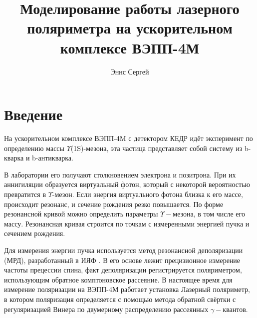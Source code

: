 \documentclass[14pt, a4paper]{extreport}
\begin{document}
\title{Моделирование работы лазерного поляриметра на ускорительном комплексе ВЭПП-4М}
\author{Эннс Сергей}
\maketitle

\tableofcontents
\newpage
\chapter*{ Введение}
На ускорительном комплексе ВЭПП-4M \cite{vepp4} с детектором КЕДР
\cite{kedr} идёт эксперимент по определению массы $\Upsilon$(1S)-мезона, эта частица представляет собой систему из b-кварка и b-антикварка. 

В лаборатории его получают столкновением электрона и позитрона. При их аннигиляции образуется виртуальный фотон, который с некоторой вероятностью превратится в $\Upsilon$-мезон. Если энергия виртуального фотона близка к его массе, происходит резонанс, и сечение рождения резко повышается. По форме резонансной кривой можно определить параметры $\Upsilon-$мезона, в том числе его массу. Резонансная кривая строится по точкам с измеренными энергией пучка и сечением рождения.

Для измерения энергии пучка используется метод резонансной деполяризации (МРД),
разработанный в ИЯФ \cite{resdep}. В его основе лежит прецизионное измерение частоты
прецессии спина, факт деполяризации регистрируется поляриметром,
использующим обратное комптоновское рассеяние. В настоящее время для измерение поляризации на ВЭПП-4М работает установка Лазерный поляриметр, в котором поляризация определяется с помощью метода обратной свёртки с регуляризацией Винера по двумерному распределению рассеянных $\gamma-$квантов.
\end{document}
